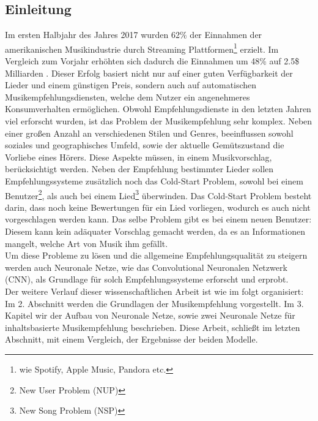 \documentclass[twosided,a4,10pt]{article}
\begin{document}
\begin{multicols}{2}
		\section{Einleitung}
		Im ersten Halbjahr des Jahres 2017 wurden 62\% der Einnahmen der amerikanischen Musikindustrie durch Streaming Plattformen\footnote[1]{wie Spotify, Apple Music, Pandora etc.} erzielt. Im Vergleich zum Vorjahr erhöhten sich dadurch die Einnahmen um 48\% auf 2.5\$ Milliarden \cite{friedlander}. Dieser Erfolg basiert nicht nur auf einer guten Verfügbarkeit der Lieder und einem günstigen Preis, sondern auch auf automatischen Musikempfehlungsdiensten, welche dem Nutzer ein angenehmeres Konsumverhalten ermöglichen.\newline
		Obwohl Empfehlungsdienste in den letzten Jahren viel erforscht wurden, ist das Problem der Musikempfehlung sehr komplex. Neben einer großen Anzahl an verschiedenen Stilen und Genres, beeinflussen sowohl soziales und geographisches Umfeld, sowie der aktuelle Gemütszustand die Vorliebe eines Hörers. Diese Aspekte müssen, in einem Musikvorschlag, berücksichtigt werden. \cite{oord}\newline
		Neben der Empfehlung bestimmter Lieder sollen Empfehlungssysteme zusätzlich noch das Cold-Start Problem, sowohl bei einem Benutzer\footnote[2]{New User Problem (NUP)}, als auch bei einem Lied\footnote[3]{New Song Problem (NSP)} überwinden. Das Cold-Start Problem besteht darin, dass noch keine Bewertungen für ein Lied vorliegen, wodurch es auch nicht vorgeschlagen werden kann. Das selbe Problem gibt es bei einem neuen Benutzer: Diesem kann kein adäquater Vorschlag gemacht werden, da es an Informationen mangelt, welche Art von Musik ihm gefällt. \cite{celma}\\
		Um diese Probleme zu lösen und die allgemeine Empfehlungsqualität zu steigern werden auch Neuronale Netze, wie das Convolutional Neuronalen Netzwerk (CNN), als Grundlage für solch Empfehlungssysteme erforscht und erprobt.\newline\\
		Der weitere Verlauf dieser wissenschaftlichen Arbeit ist wie im folgt organisiert: Im 2. Abschnitt werden die Grundlagen der Musikempfehlung vorgestellt. Im 3. Kapitel wir der Aufbau von Neuronale Netze, sowie zwei Neuronale Netze für inhaltsbasierte Musikempfehlung beschrieben. Diese Arbeit, schließt im letzten Abschnitt, mit einem Vergleich, der Ergebnisse der beiden Modelle.


\end{multicols}
\end{document}
